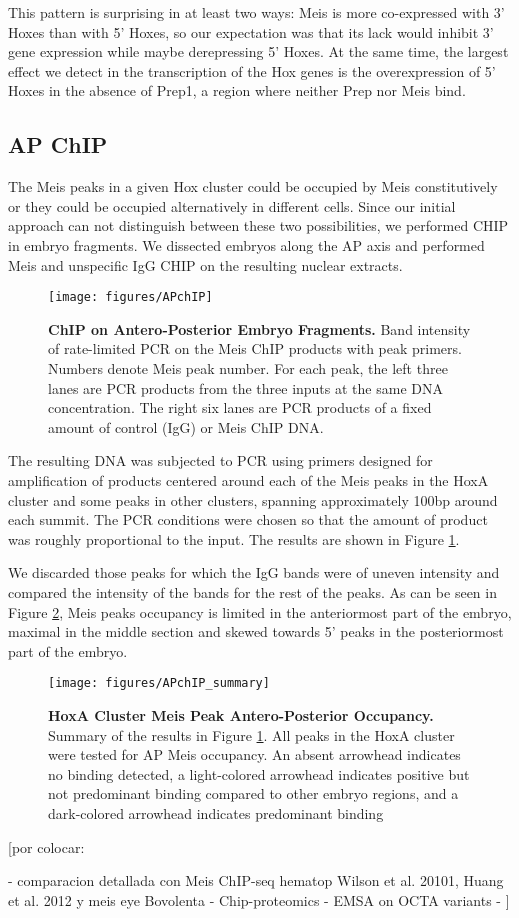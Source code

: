 This pattern is surprising in at least two ways: Meis is more co-expressed with 3' Hoxes than with 5' Hoxes, so our expectation was that its lack would inhibit 3' gene expression while maybe derepressing 5' Hoxes. At the same time, the largest effect we detect in the transcription of the Hox genes is the overexpression of 5' Hoxes in the absence of Prep1, a region where neither Prep nor Meis bind.

\subsection{AP ChIP}

The Meis peaks in a given Hox cluster could be occupied by Meis constitutively or they could be occupied alternatively in different cells. Since our initial approach can not distinguish between these two possibilities, we performed \ac{CHIP} in embryo fragments. We dissected embryos along the \ac{AP} axis and performed Meis and unspecific IgG \ac{CHIP} on the resulting nuclear extracts.

\begin{figure}[p]
  \centering
  \texttt{[image: figures/APchIP]}
  \caption[ChIP on Antero-Posterior Embryo Fragments]{\textbf{ChIP on Antero-Posterior Embryo Fragments.} Band intensity of rate-limited PCR on the Meis ChIP products with peak primers. Numbers denote Meis peak number. For each peak, the left three lanes are PCR products from the three inputs at the same DNA concentration. The right six lanes are PCR products of a fixed amount of control (IgG) or Meis ChIP DNA.}
  \label{fig:APchip}
\end{figure}

The resulting DNA was subjected to \ac{PCR} using primers designed for amplification of products centered around each of the Meis peaks in the HoxA cluster and some peaks in other clusters, spanning approximately 100bp around each summit. The PCR conditions were chosen so that the amount of product was roughly proportional to the input. The results are shown in Figure \ref{fig:APchip}. 

We discarded those peaks for which the IgG bands were of uneven intensity and compared the intensity of the bands for the rest of the peaks. As can be seen in Figure \ref{fig:APchipSummary}, Meis peaks occupancy is limited in the anteriormost part of the embryo, maximal in the middle section and skewed towards 5' peaks in the posteriormost part of the embryo.
\begin{figure}[]
  \centering
  \texttt{[image: figures/APchIP\_summary]}
  \caption[HoxA Cluster Meis Peak Antero-Posterior Occupancy]{\textbf{HoxA Cluster Meis Peak Antero-Posterior Occupancy.} Summary of the results in Figure \ref{fig:APchip}. All peaks in the HoxA cluster were tested for AP Meis occupancy. An absent arrowhead indicates no binding detected, a light-colored arrowhead indicates positive but not predominant binding compared to other embryo regions, and a dark-colored arrowhead indicates predominant binding}
  \label{fig:APchipSummary}
\end{figure}

[por colocar:

- comparacion detallada con Meis ChIP-seq hematop {Wilson et al. 20101, Huang et al. 2012} y meis eye {Bovolenta}
- Chip-proteomics
- EMSA on OCTA variants
- 
]
